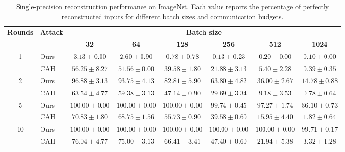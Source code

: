 \begin{table}[t]
    \centering
    \footnotesize
    \setlength{\tabcolsep}{2pt}
    \renewcommand{\arraystretch}{1.08}
    \caption{Single-precision reconstruction performance on ImageNet. Each value reports the percentage of perfectly reconstructed inputs for different batch sizes and communication budgets.}
    \label{tab:imagenet_sp}
    \begin{tabular}{@{}clcccccc@{}}
        \toprule
        \textbf{Rounds} & \textbf{Attack} & \multicolumn{6}{c}{\textbf{Batch size}} \\
        \cmidrule(l){3-8}
        & & \textbf{32} & \textbf{64} & \textbf{128} & \textbf{256} & \textbf{512} & \textbf{1024} \\
        \midrule
        \multirow{2}{*}{1}
        & Ours & $3.13 \pm 0.00$ & $2.60 \pm 0.90$ & $0.78 \pm 0.78$ & $0.13 \pm 0.23$ & $0.20 \pm 0.00$ & $0.10 \pm 0.00$ \\
        & CAH  & $\mathbf{56.25} \pm 8.27$ & $\mathbf{51.56} \pm 0.00$ & $\mathbf{39.58} \pm 1.80$ & $\mathbf{21.88} \pm 3.13$ & $\mathbf{5.40} \pm 2.28$ & $\mathbf{0.39} \pm 0.35$ \\
        \midrule
        \multirow{2}{*}{2}
        & Ours & $\mathbf{96.88} \pm 3.13$ & $\mathbf{93.75} \pm 4.13$ & $\mathbf{82.81} \pm 5.90$ & $\mathbf{63.80} \pm 4.82$ & $\mathbf{36.00} \pm 2.67$ & $\mathbf{14.78} \pm 0.88$ \\
        & CAH  & $63.54 \pm 4.77$ & $59.38 \pm 3.13$ & $47.14 \pm 0.90$ & $29.69 \pm 3.34$ & $9.18 \pm 3.53$ & $0.78 \pm 0.64$ \\
        \midrule
        \multirow{2}{*}{5}
        & Ours & $\mathbf{100.00} \pm 0.00$ & $\mathbf{100.00} \pm 0.00$ & $\mathbf{100.00} \pm 0.00$ & $\mathbf{99.74} \pm 0.45$ & $\mathbf{97.27} \pm 1.74$ & $\mathbf{86.10} \pm 0.73$ \\
        & CAH  & $70.83 \pm 1.80$ & $68.75 \pm 1.56$ & $55.73 \pm 0.90$ & $39.58 \pm 0.60$ & $15.95 \pm 4.40$ & $1.82 \pm 0.64$ \\
        \midrule
        \multirow{2}{*}{10}
        & Ours & $\mathbf{100.00} \pm 0.00$ & $\mathbf{100.00} \pm 0.00$ & $\mathbf{100.00} \pm 0.00$ & $\mathbf{100.00} \pm 0.00$ & $\mathbf{100.00} \pm 0.00$ & $\mathbf{99.71} \pm 0.17$ \\
        & CAH  & $76.04 \pm 4.77$ & $75.00 \pm 3.13$ & $66.41 \pm 3.41$ & $47.40 \pm 0.60$ & $21.94 \pm 5.38$ & $3.32 \pm 1.28$ \\
        \bottomrule
    \end{tabular}
\end{table}

